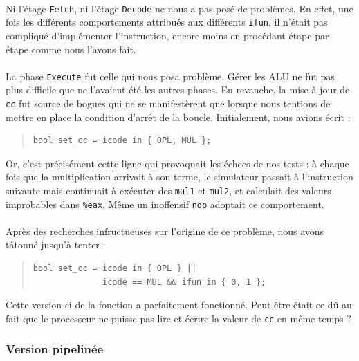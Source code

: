 \documentclass[12pt]{article}
\begin{document}
\paragraph{}Ni l'étage \verb+Fetch+, ni l'étage \verb+Decode+ ne nous a pas posé de problèmes. En effet, une fois les différents comportements attribués aux différents \verb+ifun+, il n'était pas compliqué d'implémenter l'instruction, encore moins en procédant étape par étape comme nous l'avons fait.

\paragraph{}La phase \verb+Execute+ fut celle qui nous posa problème. Gérer les ALU ne fut pas plus difficile que ne l'avaient été les autres phases. En revanche, la mise à jour de \verb+cc+ fut source de bogues qui ne se manifestèrent que lorsque nous tentions de mettre en place la condition d'arrêt de la boucle. Initialement, nous avions écrit :
\begin{quote}
\begin{verbatim}
bool set_cc = icode in { OPL, MUL };
\end{verbatim}
\end{quote}
Or, c'est précisément cette ligne qui provoquait les échecs de nos tests : à chaque fois que la multiplication arrivait à son terme, le simulateur passait à l'instruction suivante mais continuait à exécuter des \verb+mul1+ et \verb+mul2+, et calculait des valeurs improbables dans \verb+%eax+. Même un inoffensif \verb+nop+ adoptait ce comportement.

\paragraph{}Après des recherches infructueuses sur l'origine de ce problème, nous avons tâtonné jusqu'à tenter :
\begin{quote}
\begin{verbatim}
bool set_cc = icode in { OPL } ||
              icode == MUL && ifun in { 0, 1 };
\end{verbatim}
\end{quote}
Cette version-ci de la fonction a parfaitement fonctionné. Peut-être était-ce dû au fait que le processeur ne puisse pas lire et écrire la valeur de \verb+cc+ en même temps ?

\subsubsection{Version pipelinée}
\end{document}
